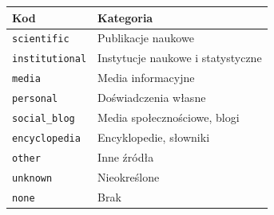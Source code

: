 \begin{tabular}{ll}
\toprule
Kod & Kategoria \\
\midrule
\texttt{scientific} & Publikacje naukowe \\
\texttt{institutional} & Instytucje naukowe i statystyczne \\
\texttt{media} & Media informacyjne \\
\texttt{personal} & Doświadczenia własne \\
\texttt{social\_blog} & Media społecznościowe, blogi \\
\texttt{encyclopedia} & Encyklopedie, słowniki \\
\texttt{other} & Inne źródła \\
\texttt{unknown} & Nieokreślone \\
\texttt{none} & Brak \\
\bottomrule
\end{tabular}
